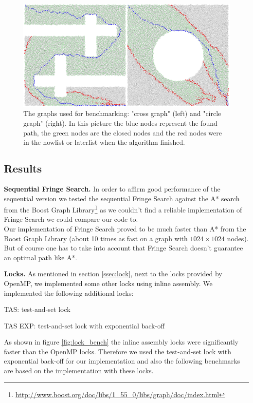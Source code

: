 \documentclass[letterpaper]{article}
\newcommand{\mypar}[1]{{\bf #1.}}
\begin{document}
\begin{figure}[h]\centering
  \includegraphics[scale=0.3]{benchmark_graphs.eps}
  \caption{The graphs used for benchmarking: "cross graph" (left) and "circle graph" (right). In this picture the blue nodes represent the found path, the green nodes are the closed nodes and the red nodes were in the nowlist or laterlist when the algorithm finished. \label{fig:graphs}}
\end{figure}

\subsection{Results}\label{ssec:results}

\mypar{Sequential Fringe Search}
In order to affirm good performance of the sequential version we tested the sequential Fringe Search against the A* search from the Boost Graph Library\footnote{\url{http://www.boost.org/doc/libs/1_55_0/libs/graph/doc/index.html}} as we couldn't find a reliable implementation of Fringe Search we could compare our code to.\\
Our implementation of Fringe Search proved to be much faster than A* from the Boost Graph Library (about 10 times as fast on a graph with $1024 \times 1024$ nodes). But of course one has to take into account that Fringe Search doesn't guarantee an optimal path like A*.

\mypar{Locks}
As mentioned in section \ref{ssec:lock}, next to the locks provided by OpenMP, we implemented some other locks using inline assembly. We implemented the following additional locks:
\begin{compactitem}
\item TAS: test-and-set lock
\item TAS EXP: test-and-set lock with exponential back-off
\end{compactitem}
As shown in figure \ref{fig:lock_bench} the inline assembly locks were significantly faster than the OpenMP locks. Therefore we used the test-and-set lock with exponential back-off for our implementation and also the following benchmarks are based on the implementation with these locks.
\end{document}
